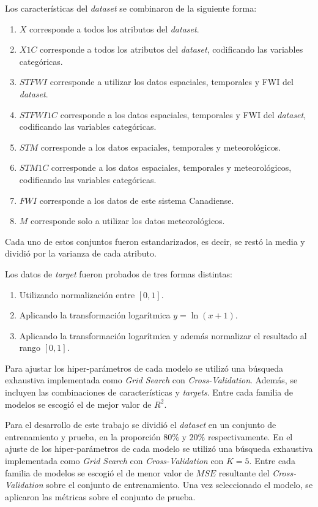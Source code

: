 \documentclass[spanish]{article}
\begin{document}
        Los características del \emph{dataset} se combinaron de la siguiente forma:
        \begin{enumerate}
          \item $X$ corresponde a todos los atributos del \emph{dataset}.
          \item $X1C$ corresponde a todos los atributos del \emph{dataset}, codificando las variables 
            categóricas.
          \item $STFWI$ corresponde a utilizar los datos espaciales, temporales y FWI del \emph{dataset}.
          \item $STFWI1C$ corresponde a los datos espaciales, temporales y FWI del \emph{dataset}, 
            codificando las variables categóricas.
          \item $STM$ corresponde a los datos espaciales, temporales y meteorológicos.
          \item $STM1C$ corresponde a los datos espaciales, temporales y meteorológicos, codificando las 
            variables categóricas.
          \item $FWI$ corresponde a los datos de este sistema Canadiense.
          \item $M$ corresponde solo a utilizar los datos meteorológicos.
        \end{enumerate}
        
        Cada uno de estos conjuntos fueron estandarizados, es decir, se restó la media y dividió por la varianza 
        de cada atributo.
        
        Los datos de \emph{target} fueron probados de tres formas distintas:
        \begin{enumerate}
          \item Utilizando normalización entre $[0, 1]$.
          \item Aplicando la transformación logarítmica $y=\ln(x+1)$.
          \item Aplicando la transformación logarítmica y además normalizar el resultado al rango $[0, 1]$.
        \end{enumerate}
        
        Para ajustar los hiper-parámetros de cada modelo se utilizó una búsqueda exhaustiva implementada como 
        \emph{Grid Search} con \emph{Cross-Validation}. Además, se incluyen las combinaciones de características 
        y \emph{targets}. Entre cada familia de modelos se escogió el de mejor valor de $R^2$.
        \fi

        Para el desarrollo de este trabajo se dividió el \emph{dataset} en un conjunto de entrenamiento y prueba, en 
        la proporción $80\%$ y $20\%$ respectivamente. En el ajuste de los hiper-parámetros de cada modelo se utilizó 
        una búsqueda exhaustiva implementada como \emph{Grid Search} con \emph{Cross-Validation} con $K=5$. Entre cada familia 
        de modelos se escogió el de menor valor de $MSE$ resultante del \emph{Cross-Validation} sobre el conjunto de
        entrenamiento. Una vez seleccionado el modelo, se aplicaron las métricas sobre el conjunto de prueba.
          
\end{document}
